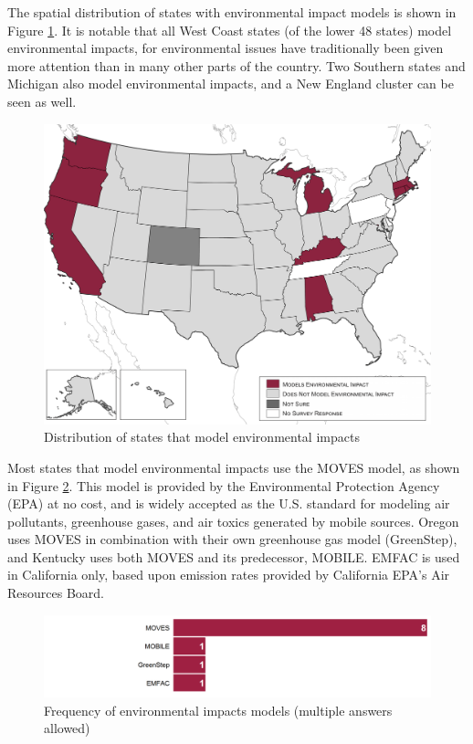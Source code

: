 The spatial distribution of states with environmental impact models is shown in Figure \ref{fig:environmental-model-states}. It is notable that all West Coast states (of the lower 48 states) model environmental impacts, for environmental issues have traditionally been given more attention than in many other parts of the country. Two Southern states and Michigan also model environmental impacts, and a New England cluster can be seen as well.

\begin{figure}   %
\centering
\includegraphics[width=6.5in]{graphics/33-environmental-model-states}
\caption{Distribution of states that model environmental impacts}
\label{fig:environmental-model-states}
\end{figure}

Most states that model environmental impacts use the MOVES model, as shown in Figure \ref{fig:environmental-impact-models}. This model is provided by the Environmental Protection Agency (EPA) at no cost, and is widely accepted as the U.S. standard for modeling air pollutants, greenhouse gases, and air toxics generated by mobile sources. Oregon uses MOVES in combination with their own greenhouse gas model (GreenStep), and Kentucky uses both MOVES and its predecessor, MOBILE. EMFAC is used in California only, based upon emission rates provided by California EPA's Air Resources Board.

\begin{figure}   %
\centering
\includegraphics[width=6.4in]{graphics/34-environmental-impact-models}
\caption[Frequency of environmental impacts models]{Frequency of environmental impacts models (multiple answers allowed)}
\label{fig:environmental-impact-models}
\end{figure}

